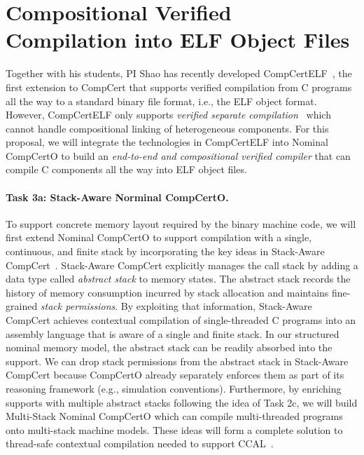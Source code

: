 \section{Compositional Verified Compilation into ELF Object Files}

Together with his students, PI Shao has recently developed
CompCertELF~\cite{compcertelf20}, the first extension to CompCert that
supports verified compilation from C programs all the way to a
standard binary file format, i.e., the ELF object format.  However,
CompCertELF only supports {\em{}verified separate
compilation}~\cite{sepcompcert} which cannot handle compositional linking of
heterogeneous components.  For this proposal, we will integrate the
technologies in CompCertELF into Nominal CompCertO to build an {\em
  end-to-end and compositional verified compiler} that can compile C
components all the way into ELF object files.

\paragraph*{Task 3a: Stack-Aware Norminal CompCertO.}
To support concrete memory layout required by the binary machine code,
we will first extend Nominal CompCertO to support compilation with a
single, continuous, and finite stack by incorporating the key ideas in
Stack-Aware CompCert~\cite{wang2019,compcertelf20}.  Stack-Aware
CompCert explicitly manages the call stack by adding a data type
called \emph{abstract stack} to memory states. The abstract stack
records the history of memory consumption incurred by stack allocation
and maintains fine-grained \emph{stack permissions}. By exploiting
that information, Stack-Aware CompCert achieves contextual compilation
of single-threaded C programs into an assembly language that is aware
of a single and finite stack.  In our structured nominal memory model,
the abstract stack can be readily absorbed into the support. We can
drop stack permissions from the abstract stack in Stack-Aware CompCert
because CompCertO already separately enforces them as part of its
reasoning framework (e.g., simulation conventions).  Furthermore, by
enriching supports with multiple abstract stacks following the idea of
Task 2c, we will build Multi-Stack Nominal CompCertO which can compile
multi-threaded programs onto multi-stack machine models. These ideas
will form a complete solution to thread-safe contextual compilation
needed to support CCAL~\cite{ccal18}.


